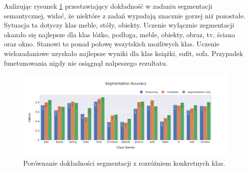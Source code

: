 \vspace{0.5cm}

Anlizując rysunek \ref{fig:segmentation-acc} przestawiający dokładność w zadaniu segmentacji semantycznej, widać, że niektóre z zadań wypadają znacznie gorzej niż pozostałe. Sytuacja ta dotyczy klas meble, stóły, obiekty. Uczenie wyłącznie zegmentacji okazało się najlepsze dla klas łóżko, podłoga, meble, obiekty, obraz, tv, ściana oraz okno. Stanowi to ponad połowę wszytskich możliwych klas. Uczenie wielozadaniowe uzyskało najlepsze wyniki dla klas książki, sufit, sofa. Przypadek funetunowania nigdy nie osiągnął nalpeszego rezultatu.
\begin{figure}[ht!]
    \centering
    \includegraphics[width=\textwidth]{result_imgs_sorted/Segmentation-Accuracy.jpeg}
    \caption{Porównanie dokładności segmentacji z rozróżniem konkretnych klas.}
    \label{fig:segmentation-acc}
\end{figure}

